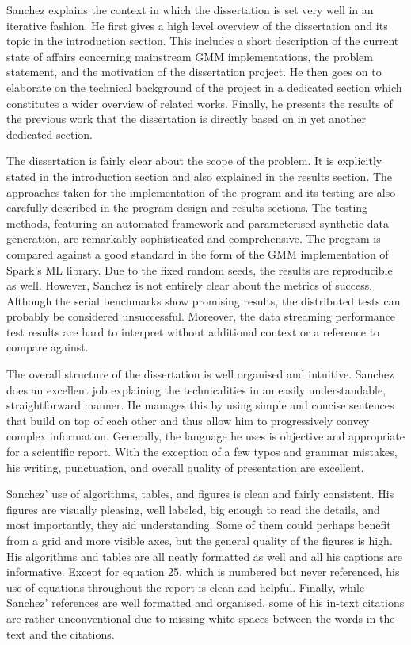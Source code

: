 \documentclass{article}
\begin{document}
Sanchez explains the context in which the dissertation is set very well in an iterative fashion. He first gives a high level overview of the dissertation and its topic in the introduction section. This includes a short description of the current state of affairs concerning mainstream GMM implementations, the problem statement, and the motivation of the dissertation project. He then goes on to elaborate on the technical background of the project in a dedicated section which constitutes a wider overview of related works. Finally, he presents the results of the previous work that the dissertation is directly based on in yet another dedicated section.

The dissertation is fairly clear about the scope of the problem. It is explicitly stated in the introduction section and also explained in the results section. The approaches taken for the implementation of the program and its testing are also carefully described in the program design and results sections. The testing methods, featuring an automated framework and parameterised synthetic data generation, are remarkably sophisticated and comprehensive. The program is compared against a good standard in the form of the GMM implementation of Spark's ML library. Due to the fixed random seeds, the results are reproducible as well. However, Sanchez is not entirely clear about the metrics of success. Although the serial benchmarks show promising results, the distributed tests can probably be considered unsuccessful. Moreover, the data streaming performance test results are hard to interpret without additional context or a reference to compare against.

The overall structure of the dissertation is well organised and intuitive. Sanchez does an excellent job explaining the technicalities in an easily understandable, straightforward manner. He manages this by using simple and concise sentences that build on top of each other and thus allow him to progressively convey complex information. Generally, the language he uses is objective and appropriate for a scientific report. With the exception of a few typos and grammar mistakes, his writing, punctuation, and overall quality of presentation are excellent.

Sanchez' use of algorithms, tables, and figures is clean and fairly consistent. His figures are visually pleasing, well labeled, big enough to read the details, and most importantly, they aid understanding. Some of them could perhaps benefit from a grid and more visible axes, but the general quality of the figures is high. His algorithms and tables are all neatly formatted as well and all his captions are informative. Except for equation 25, which is numbered but never referenced, his use of equations throughout the report is clean and helpful. Finally, while Sanchez' references are well formatted and organised, some of his in-text citations are rather unconventional due to missing white spaces between the words in the text and the citations.



\pagebreak



\end{document}
